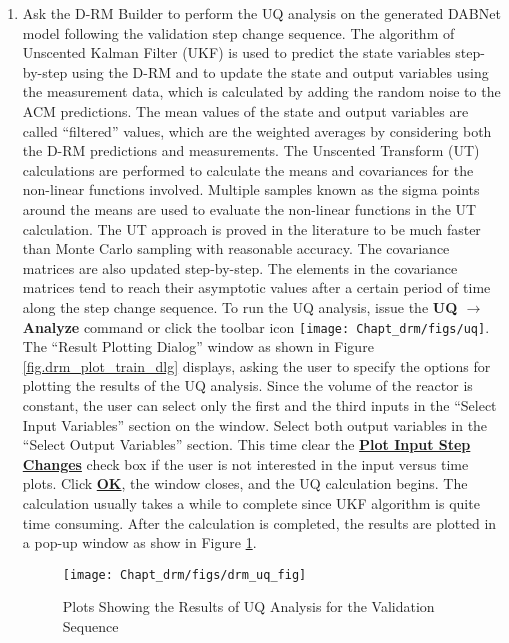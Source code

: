 \begin{enumerate}
	\item Ask the D-RM Builder to perform the UQ analysis on the generated DABNet model following the validation step change sequence.  The algorithm of Unscented Kalman Filter (UKF) is used to predict the state variables step-by-step using the D-RM and to update the state and output variables using the measurement data, which is calculated by adding the random noise to the ACM predictions.  The mean values of the state and output variables are called ``filtered'' values, which are the weighted averages by considering both the D-RM predictions and measurements.  The Unscented Transform (UT) calculations are performed to calculate the means and covariances for the non-linear functions involved.  Multiple samples known as the sigma points around the means are used to evaluate the non-linear functions in the UT calculation.  The UT approach is proved in the literature to be much faster than Monte Carlo sampling with reasonable accuracy.  The covariance matrices are also updated step-by-step.  The elements in the covariance matrices tend to reach their asymptotic values after a certain period of time along the step change sequence.  To run the UQ analysis, issue the \textbf{UQ $\rightarrow$ Analyze} command or click the toolbar icon \texttt{[image: Chapt\_drm/figs/uq]}.  The ``Result Plotting Dialog'' window as shown in Figure \ref{fig.drm_plot_train_dlg} displays, asking the user to specify the options for plotting the results of the UQ analysis.
	Since the volume of the reactor is constant, the user can select only the first and the third inputs in the ``Select Input Variables'' section on the window.  Select both output variables in the ``Select Output Variables'' section.  This time clear the \textbf{\underline{Plot Input Step Changes}} check box if the user is not interested in the input versus time plots.  Click \textbf{\underline{OK}}, the window closes, and the UQ calculation begins.  The calculation usually takes a while to complete since UKF algorithm is quite time consuming.  After the calculation is completed, the results are plotted in a pop-up window as show in Figure \ref{fig.drm_uq_fig}.
	\begin{figure}[H]
		\begin{center}
			\texttt{[image: Chapt\_drm/figs/drm\_uq\_fig]}
			\caption{Plots Showing the Results of UQ Analysis for the Validation Sequence}
			\label{fig.drm_uq_fig}
		\end{center}
	\end{figure}

\end{enumerate}
